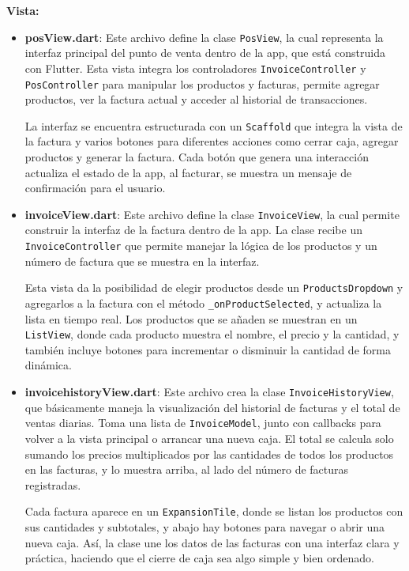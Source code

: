 \textbf{Vista:}  
\begin{itemize}
    \item \textbf{posView.dart}: Este archivo define la clase \texttt{PosView}, la cual representa la interfaz principal del punto de venta dentro de la app, que está construida con Flutter. Esta vista integra los controladores \texttt{InvoiceController} y \texttt{PosController} para manipular los productos y facturas, permite agregar productos, ver la factura actual y acceder al historial de transacciones.
    
    La interfaz se encuentra estructurada con un \texttt{Scaffold} que integra la vista de la factura y varios botones para diferentes acciones como cerrar caja, agregar productos y generar la factura. Cada botón que genera una interacción actualiza el estado de la app, al facturar, se muestra un mensaje de confirmación para el usuario.

    \item \textbf{invoiceView.dart}:  Este archivo define la clase \texttt{InvoiceView}, la cual permite construir la interfaz de la factura dentro de la app. La clase recibe un \texttt{InvoiceController} que permite manejar la lógica de los productos y un número de factura que se muestra en la interfaz.

    Esta vista da la posibilidad de elegir productos desde un \texttt{ProductsDropdown} y agregarlos a la factura con el método \texttt{\_onProductSelected}, y actualiza la lista en tiempo real. Los productos que se añaden se muestran en un \texttt{ListView}, donde cada producto muestra el nombre, el precio y la cantidad, y también incluye botones para incrementar o disminuir la cantidad de forma dinámica.

    \item \textbf{invoicehistoryView.dart}: Este archivo crea la clase \texttt{InvoiceHistoryView}, que básicamente maneja la visualización del historial de facturas y el total de ventas diarias. Toma una lista de \texttt{InvoiceModel}, junto con callbacks para volver a la vista principal o arrancar una nueva caja. El total se calcula solo sumando los precios multiplicados por las cantidades de todos los productos en las facturas, y lo muestra arriba, al lado del número de facturas registradas.

    Cada factura aparece en un \texttt{ExpansionTile}, donde se listan los productos con sus cantidades y subtotales, y abajo hay botones para navegar o abrir una nueva caja. Así, la clase une los datos de las facturas con una interfaz clara y práctica, haciendo que el cierre de caja sea algo simple y bien ordenado.


\end{itemize}
